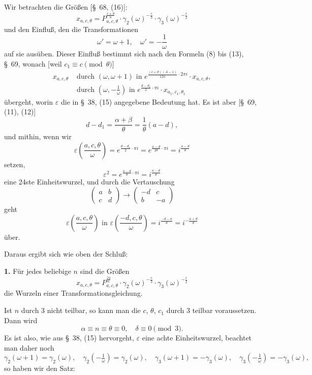 \documentclass[12pt,a4paper]{article}
\theoremstyle{definition}
\begin{document}
Wir betrachten die Größen [\S\ 68, (16)]:
\begin{equation}\label{eq:72-1}
x_{a,c,\theta} = P_{a,c,\theta}^{\frac{c + \theta}{n}} \cdot \gamma_2(\omega)^{-\frac{c}{3}} \cdot \gamma_3(\omega)^{-\frac{c}{2}}
\end{equation}
und den Einfluß, den die Transformationen
\[
\omega' = \omega + 1, \quad \omega' = -\frac{1}{\omega}
\]
auf sie ausüben. Dieser Einfluß bestimmt sich nach den Formeln (8) bis (13), \S\ 69, wonach [weil $c_1 \equiv c \pmod{\theta}$]
\begin{equation}\label{eq:72-2}
\begin{aligned}
x_{a,c,\theta} &\text{ durch } (\omega, \omega+1) \text{ in } e^{\frac{(c+\theta)(A-1)}{12n} \cdot 2\pi i} \cdot x_{a,c,\theta}, \\
&\text{ durch } (\omega, -\tfrac{1}{\omega}) \text{ in } e^{\frac{d-d_1}{2} \cdot \pi i} \cdot x_{a_1,c_1,\theta_1}
\end{aligned}
\end{equation}
übergeht, worin $\varepsilon$ die in \S\ 38, (15) angegebene Bedeutung hat. Es ist aber [\S\ 69, (11), (12)]
\[
d - d_1 = \frac{\alpha + \beta}{\theta} = \frac{1}{\theta}(a - d),
\]
und mithin, wenn wir
\[
\varepsilon\left(\frac{a,c,\theta}{\omega}\right) = e^{\frac{d-d_1}{2} \cdot \pi i} = e^{\frac{a-d}{2\theta} \cdot \pi i} = i^{\frac{a-d}{\theta}}
\]
setzen,
\[
\varepsilon^2 = e^{\frac{a-d}{\theta} \cdot \pi i} = i^{\frac{a-d}{\theta}}
\]
eine 24ste Einheitswurzel, und durch die Vertauschung
\[
\begin{pmatrix} a & b \\ c & d \end{pmatrix} \to \begin{pmatrix} -d & c \\ b & -a \end{pmatrix}
\]
geht
\[
\varepsilon\left(\frac{a,c,\theta}{\omega}\right) \text{ in } \varepsilon\left(\frac{-d,c,\theta}{\omega}\right) = i^{\frac{-d-a}{\theta}} = i^{-\frac{a+d}{\theta}}
\]
über.

Daraus ergibt sich wie oben der Schluß:

\textbf{1.} Für jedes beliebige $n$ sind die Größen
\[
x_{a,c,\theta} = P_{a,c,\theta}^{\frac{24}{n}} \cdot \gamma_2(\omega)^{-\frac{c}{3}} \cdot \gamma_3(\omega)^{-\frac{c}{2}}
\]
die Wurzeln einer Transformationsgleichung.

Ist $n$ durch 3 nicht teilbar, so kann man die $c$, $\theta$, $c_1$ durch 3 teilbar voraussetzen. Dann wird
\[
\alpha \equiv n \equiv \theta \equiv 0, \quad \delta \equiv 0 \pmod{3}.
\]
Es ist also, wie aus \S\ 38, (15) hervorgeht, $\varepsilon$ eine achte Einheitswurzel, beachtet man daher noch
\[
\gamma_2(\omega+1) = \gamma_2(\omega), \quad \gamma_2(-\tfrac{1}{\omega}) = \gamma_2(\omega), \quad \gamma_3(\omega+1) = -\gamma_3(\omega), \quad \gamma_3(-\tfrac{1}{\omega}) = -\gamma_3(\omega),
\]
so haben wir den Satz:
\end{document}
